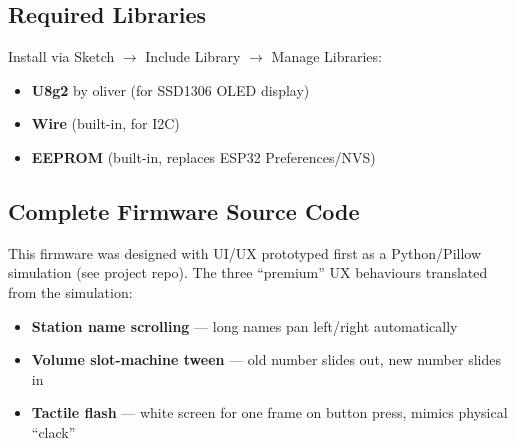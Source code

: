 \documentclass[a4paper,11pt]{article}
\renewcommand*{\,}{ }%
\begin{document}
\subsection{Required Libraries}

Install via Sketch $\rightarrow$ Include Library $\rightarrow$ Manage Libraries:
\begin{itemize}[noitemsep]
    \item \textbf{U8g2} by oliver (for SSD1306 OLED display)
    \item \textbf{Wire} (built-in, for I2C)
    \item \textbf{EEPROM} (built-in, replaces ESP32 Preferences/NVS)
\end{itemize}

\subsection{Complete Firmware Source Code}

\begin{infobox}
This firmware was designed with UI/UX prototyped first as a Python/Pillow simulation (see project repo). The three ``premium'' UX behaviours translated from the simulation:\begin{itemize}[noitemsep]
\item \textbf{Station name scrolling} --- long names pan left/right automatically
\item \textbf{Volume slot-machine tween} --- old number slides out, new number slides in
\item \textbf{Tactile flash} --- white screen for one frame on button press, mimics physical ``clack''
\end{itemize}
\end{infobox}
\end{document}

